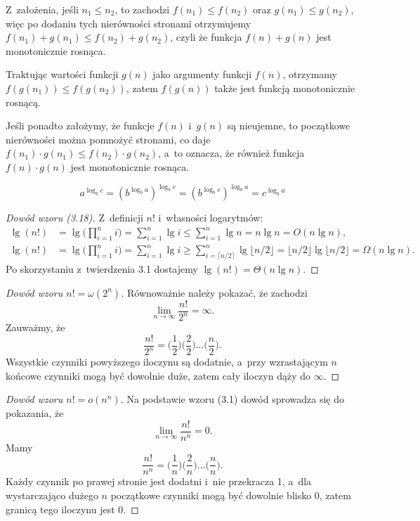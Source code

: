 
\exercise %
Z~założenia, jeśli $n_1\le n_2$, to zachodzi $f(n_1)\le f(n_2)$ oraz $g(n_1)\le g(n_2)$, więc po dodaniu tych nierówności stronami otrzymujemy $f(n_1)+g(n_1)\le f(n_2)+g(n_2)$, czyli że funkcja $f(n)+g(n)$ jest monotonicznie rosnąca.

Traktując wartości funkcji $g(n)$ jako argumenty funkcji $f(n)$, otrzymamy $f(g(n_1))\le f(g(n_2))$, zatem $f(g(n))$ także jest funkcją monotonicznie rosnącą.

Jeśli ponadto założymy, że funkcje $f(n)$ i~$g(n)$ są nieujemne, to początkowe nierówności można pomnożyć stronami, co daje $f(n_1)\cdot g(n_1)\le f(n_2)\cdot g(n_2)$, a~to oznacza, że również funkcja $f(n)\cdot g(n)$ jest monotonicznie rosnąca.

\exercise %
\[
	a^{\log_bc} = \left(b^{\log_ba}\right)^{\log_bc} = \left(b^{\log_bc}\right)^{\log_ba} = c^{\log_ba}
\]

\exercise %
\begin{proof}[Dowód wzoru (3.18)]
	Z~definicji $n!$ i~własności logarytmów:
	\begin{align*}
		\lg(n!) &= \lg\biggl(\prod_{i=1}^ni\biggr) = \sum_{i=1}^n\lg i \le \sum_{i=1}^n\lg n = n\lg n = O(n\lg n), \\[1mm]
		\lg(n!) &= \lg\biggl(\prod_{i=1}^ni\biggr) = \sum_{i=1}^n\lg i \ge \sum_{i=\lceil n/2\rceil}^n\!\!\lg\lfloor n/2\rfloor = \lfloor n/2\rfloor\lg\lfloor n/2\rfloor = \Omega(n\lg n).
	\end{align*}
	Po skorzystaniu z~twierdzenia 3.1 dostajemy $\lg(n!)=\Theta(n\lg n)$.
\end{proof}

\begin{proof}[Dowód wzoru $n!=\omega(2^n)$]
	Równoważnie należy pokazać, że zachodzi
	\[
		\lim_{n\to\infty}\frac{n!}{2^n} = \infty.
	\]
	Zauważmy, że
	\[
	    \frac{n!}{2^n} = \biggl(\frac{1}{2}\biggr)\biggl(\frac{2}{2}\biggr)\dots\biggl(\frac{n}{2}\biggr).
	\]
	Wszystkie czynniki powyższego iloczynu są dodatnie, a~przy wzrastającym $n$ końcowe czynniki mogą być dowolnie duże, zatem cały iloczyn dąży do $\infty$.
\end{proof}

\begin{proof}[Dowód wzoru $n!=o(n^n)$]
	Na podstawie wzoru (3.1) dowód sprowadza się do pokazania, że
	\[
		\lim_{n\to\infty}\frac{n!}{n^n} = 0.
	\]
	Mamy
	\[
	    \frac{n!}{n^n} = \biggl(\frac{1}{n}\biggr)\biggl(\frac{2}{n}\biggr)\dots\biggl(\frac{n}{n}\biggr).
	\]
	Każdy czynnik po prawej stronie jest dodatni i~nie przekracza 1, a~dla wystarczająco dużego $n$ początkowe czynniki mogą być dowolnie blisko 0, zatem granicą tego iloczynu jest 0.
\end{proof}

